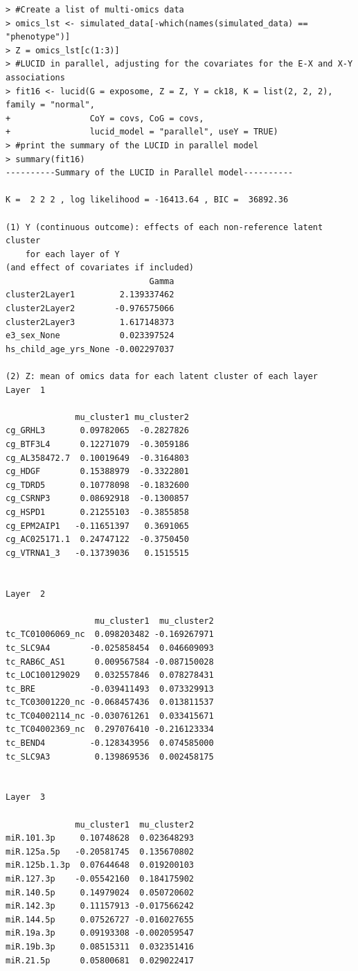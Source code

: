 \begin{verbatim}
> #Create a list of multi-omics data
> omics_lst <- simulated_data[-which(names(simulated_data) == "phenotype")]
> Z = omics_lst[c(1:3)]  
> #LUCID in parallel, adjusting for the covariates for the E-X and X-Y associations
> fit16 <- lucid(G = exposome, Z = Z, Y = ck18, K = list(2, 2, 2), family = "normal", 
+                CoY = covs, CoG = covs,
+                lucid_model = "parallel", useY = TRUE)
> #print the summary of the LUCID in parallel model      
> summary(fit16)
----------Summary of the LUCID in Parallel model---------- 
 
K =  2 2 2 , log likelihood = -16413.64 , BIC =  36892.36 
 
(1) Y (continuous outcome): effects of each non-reference latent cluster 
    for each layer of Y 
(and effect of covariates if included) 
                             Gamma
cluster2Layer1         2.139337462
cluster2Layer2        -0.976575066
cluster2Layer3         1.617148373
e3_sex_None            0.023397524
hs_child_age_yrs_None -0.002297037

(2) Z: mean of omics data for each latent cluster of each layer 
Layer  1 
 
              mu_cluster1 mu_cluster2
cg_GRHL3       0.09782065  -0.2827826
cg_BTF3L4      0.12271079  -0.3059186
cg_AL358472.7  0.10019649  -0.3164803
cg_HDGF        0.15388979  -0.3322801
cg_TDRD5       0.10778098  -0.1832600
cg_CSRNP3      0.08692918  -0.1300857
cg_HSPD1       0.21255103  -0.3855858
cg_EPM2AIP1   -0.11651397   0.3691065
cg_AC025171.1  0.24747122  -0.3750450
cg_VTRNA1_3   -0.13739036   0.1515515

 
Layer  2 
 
                  mu_cluster1  mu_cluster2
tc_TC01006069_nc  0.098203482 -0.169267971
tc_SLC9A4        -0.025858454  0.046609093
tc_RAB6C_AS1      0.009567584 -0.087150028
tc_LOC100129029   0.032557846  0.078278431
tc_BRE           -0.039411493  0.073329913
tc_TC03001220_nc -0.068457436  0.013811537
tc_TC04002114_nc -0.030761261  0.033415671
tc_TC04002369_nc  0.297076410 -0.216123334
tc_BEND4         -0.128343956  0.074585000
tc_SLC9A3         0.139869536  0.002458175

 
Layer  3 
 
              mu_cluster1  mu_cluster2
miR.101.3p     0.10748628  0.023648293
miR.125a.5p   -0.20581745  0.135670802
miR.125b.1.3p  0.07644648  0.019200103
miR.127.3p    -0.05542160  0.184175902
miR.140.5p     0.14979024  0.050720602
miR.142.3p     0.11157913 -0.017566242
miR.144.5p     0.07526727 -0.016027655
miR.19a.3p     0.09193308 -0.002059547
miR.19b.3p     0.08515311  0.032351416
miR.21.5p      0.05800681  0.029022417


\end{verbatim}
